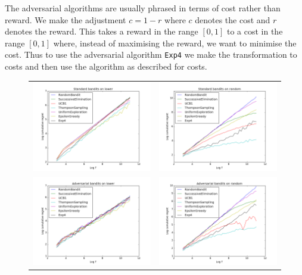\documentclass[10pt]{article}
\begin{document}
The adversarial algorithms are usually phrased in terms of cost rather than
reward. We make the adjustment $c = 1 - r$ where $c$ denotes the cost and $r$
denotes the reward. This takes a reward in the range $[0,1]$ to a cost in the
range $[0,1]$ where, instead of maximising the reward, we want to minimise the
cost. Thus to use the adversarial algorithm \verb'Exp4' we make the
transformation to costs and then use the algorithm as described for costs.

\begin{figure}[!ht]
    \center
    \begin{tabular}{cc}
        \includegraphics[width=7cm]{"plots/standard-all-lower-numTs-45"} &
        \includegraphics[width=7cm]{"plots/standard-all-random-numTs-45"} \\
        \includegraphics[width=7cm]{"plots/adversarial-all-lower-numTs-45"} &
        \includegraphics[width=7cm]{"plots/adversarial-all-random-numTs-45"} \\

\end{tabular}
\end{figure}
\end{document}
